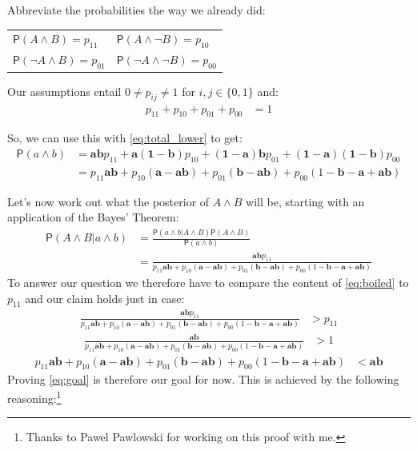 \documentclass[10pt,dvipsnames,enabledeprecatedfontcommands]{scrartcl}
\newcommand{\n}{\neg}
\newcommand{\et}{\wedge}
\newcommand{\pr}[1]{\mathsf{P}(#1)}
\begin{document}
\vspace{-2mm}

Abbreviate the probabilities the way we already did:

\begin{center}
\begin{tabular}{ll}
$\pr{A\et B} = p_{11}$ & $\pr{A\et \n B} = p_{10}$\\
$\pr{\n A \et B} = p_{01}$ & $\pr{\n A \et \n B}=p_{00}$
\end{tabular}
\end{center}

Our assumptions entail \(0\neq p_{ij}\neq 1\) for \(i,j\in \{0,1\}\)
and: \begin{align}\label{eq:sumupto1}
p_{11}+p_{10}+p_{01}+p_{00}&=1
\end{align}

\noindent So, we can use this with \eqref{eq:total_lower} to get:
\begin{align}\label{eq:aetb}
\pr{a\et b} & =  \mathbf{ab}p_{11} + \mathbf{a(1-b)}p_{10}+\mathbf{(1-a)b}p_{01} + \mathbf{(1-a)(1-b)}p_{00}\\ \nonumber
& = p_{11}\mathbf{ab} + p_{10}(\mathbf{a}-\mathbf{ab}) + p_{01}(\mathbf{b}-\mathbf{ab})+p_{00}(1-\mathbf{b}-\mathbf{a}+\mathbf{ab})
\end{align}

Let's now work out what the posterior of \(A\et B\) will be, starting
with an application of the Bayes' Theorem: \begin{align} \nonumber
\pr{A\et B \vert a\et b} & = \frac{\pr{a\et b \vert A \et B}\pr{A\et B}}{\pr{a\et b}}
\\ \label{eq:boiled}
& = \frac{\mathbf{ab}p_{11}}{p_{11}\mathbf{ab} + p_{10}(\mathbf{a}-\mathbf{ab}) + p_{01}(\mathbf{b}-\mathbf{ab})+p_{00}(1-\mathbf{b}-\mathbf{a}+\mathbf{ab})}
\end{align} To answer our question we therefore have to compare the
content of \eqref{eq:boiled} to \(p_{11}\) and our claim holds just in
case: \begin{align*}
\frac{\mathbf{ab}p_{11}}{p_{11}\mathbf{ab} + p_{10}(\mathbf{a}-\mathbf{ab}) + p_{01}(\mathbf{b}-\mathbf{ab})+p_{00}(1-\mathbf{b}-\mathbf{a}+\mathbf{ab})} &> p_{11}
\end{align*} \begin{align*}
 \frac{\mathbf{ab}}{p_{11}\mathbf{ab} + p_{10}(\mathbf{a}-\mathbf{ab}) + p_{01}(\mathbf{b}-\mathbf{ab})+p_{00}(1-\mathbf{b}-\mathbf{a}+\mathbf{ab})} & > 1\end{align*}
\begin{align}  
 \label{eq:goal}
p_{11}\mathbf{ab} + p_{10}(\mathbf{a}-\mathbf{ab}) + p_{01}(\mathbf{b}-\mathbf{ab})+p_{00}(1-\mathbf{b}-\mathbf{a}+\mathbf{ab}) & < \mathbf{ab}
\end{align} Proving \eqref{eq:goal} is therefore our goal for now. This
is achieved by the following
reasoning:\footnote{Thanks to Pawel Pawlowski for working on this proof with me.}
\end{document}
